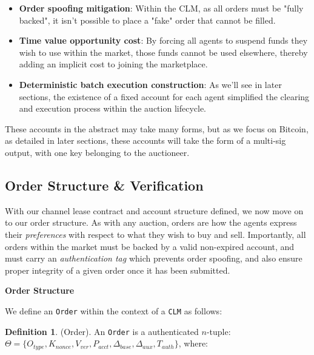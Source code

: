 \documentclass[10pt,a4paper]{article}
\theoremstyle{definition}
\newtheorem{definition}{Definition}[section]
\begin{document}
\begin{itemize} %
    \item \textbf{Order spoofing mitigation}: Within the CLM, as all orders
        must be "fully backed", it isn't possible to place a "fake" order that
        cannot be filled.

    \item \textbf{Time value opportunity cost}: By forcing all agents to
        suspend funds they wish to use within the market, those funds cannot be
        used elsewhere, thereby adding an implicit cost to joining the
        marketplace. 

    \item \textbf{Deterministic batch execution construction}: As we'll see in
        later sections, the existence of a fixed account for each agent
        simplified the clearing and execution process within the auction
        lifecycle. 

\end{itemize}

These accounts in the abstract may take many forms, but as we focus on Bitcoin,
as detailed in later sections, these accounts will take the form of a multi-sig
output, with one key belonging to the auctioneer. 


\subsection{Order Structure \& Verification}

With our channel lease contract and account structure defined, we now move on
to our order structure. As with any auction, orders are how the agents express
their \emph{preferences} with respect to what they wish to buy and sell.
Importantly, all orders within the market must be backed by a valid non-expired
account, and must carry an \emph{authentication tag} which prevents order
spoofing, and also ensure proper integrity of a given order once it has been
submitted.

\begin{center}
\textbf{Order Structure}
\end{center}

We define an \texttt{Order} within the context of a \texttt{CLM} as follows: 

\theoremstyle{definition}
\begin{definition}{(Order).}
    An \texttt{Order} is a authenticated $n$-tuple: \\ $\Theta = \{O_{type}, K_{nonce},
    V_{ver}, P_{acct}, \Delta_{base}, \Delta_{aux}, T_{auth} \} $, where:

\end{definition}
\end{document}
